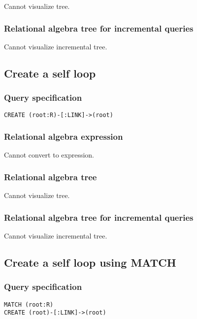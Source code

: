 Cannot visualize tree.

\subsubsection*{Relational algebra tree for incremental queries}

Cannot visualize incremental tree.

\subsection{Create a self loop}

\subsubsection*{Query specification}

\begin{lstlisting}
CREATE (root:R)-[:LINK]->(root)
\end{lstlisting}

\subsubsection*{Relational algebra expression}

Cannot convert to expression.

\subsubsection*{Relational algebra tree}

Cannot visualize tree.

\subsubsection*{Relational algebra tree for incremental queries}

Cannot visualize incremental tree.

\subsection{Create a self loop using MATCH}

\subsubsection*{Query specification}

\begin{lstlisting}
MATCH (root:R)
CREATE (root)-[:LINK]->(root)
\end{lstlisting}

